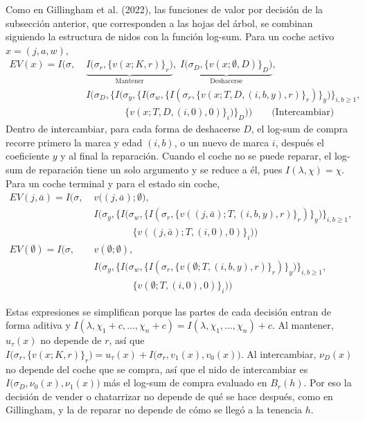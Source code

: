\documentclass{article}
\begin{document}
Como en Gillingham et al. (2022), las funciones de valor por decisión de la subsección anterior, que corresponden a las hojas del árbol, se combinan siguiendo la estructura de nidos con la función log-sum. Para un coche activo $x=(j,a,w)$,
$$\begin{aligned}EV(x)=I\Big(\sigma,\; &\underbrace{I\big(\sigma_r,\{v(x;K,r)\}_{r}\big)}_{\text{Mantener}},\;
\underbrace{I\big(\sigma_D,\{v(x;\emptyset,D)\}_{D}\big)}_{\text{Deshacerse}},\\
&I\Big(\sigma_D,\Big\{I\Big(\sigma_y,\big\{I\big(\sigma_w,\{I(\sigma_r,\{v(x;T,D,(i,b,y),r)\}_{r})\}_{y}\big)\big\}_{i,b\ge1},\\
&\qquad\qquad\{v(x;T,D,(i,0),0)\}_{i}\Big)\Big\}_{D}\Big)\Big)\qquad\text{(Intercambiar)}\end{aligned}$$
Dentro de intercambiar, para cada forma de deshacerse $D$, el log-sum de compra recorre primero la marca y edad $(i,b)$, o un nuevo de marca $i$, después el coeficiente $y$ y al final la reparación. Cuando el coche no se puede reparar, el log-sum de reparación tiene un solo argumento y se reduce a él, pues $I(\lambda,\chi)=\chi$. Para un coche terminal y para el estado sin coche,
$$\begin{aligned}
EV(j,\bar{a})=I\Big(\sigma,\;&v\big((j,\bar{a});\emptyset\big),\\
&I\Big(\sigma_y,\big\{I\big(\sigma_w,\{I(\sigma_r,\{v((j,\bar{a});T,(i,b,y),r)\}_{r})\}_{y}\big)\big\}_{i,b\ge1},\\
&\qquad\qquad\{v((j,\bar{a});T,(i,0),0)\}_{i}\Big)\Big)\\[4pt]
EV(\emptyset)=I\Big(\sigma,\;&v(\emptyset;\emptyset),\\
&I\Big(\sigma_y,\big\{I\big(\sigma_w,\{I(\sigma_r,\{v(\emptyset;T,(i,b,y),r)\}_{r})\}_{y}\big)\big\}_{i,b\ge1},\\
&\qquad\qquad\{v(\emptyset;T,(i,0),0)\}_{i}\Big)\Big)
\end{aligned}$$

Estas expresiones se simplifican porque las partes de cada decisión entran de forma aditiva y $I(\lambda,\chi_1+c,\dots,\chi_n+c)=I(\lambda,\chi_1,\dots,\chi_n)+c$. Al mantener, $u_\tau(x)$ no depende de $r$, así que $I\big(\sigma_r,\{v(x;K,r)\}_r\big)=u_\tau(x)+I\big(\sigma_r,v_1(x),v_0(x)\big)$. Al intercambiar, $\nu_D(x)$ no depende del coche que se compra, así que el nido de intercambiar es $I\big(\sigma_D,\nu_0(x),\nu_1(x)\big)$ más el log-sum de compra evaluado en $B_r(h)$. Por eso la decisión de vender o chatarrizar no depende de qué se hace después, como en Gillingham, y la de reparar no depende de cómo se llegó a la tenencia $h$.
\end{document}
